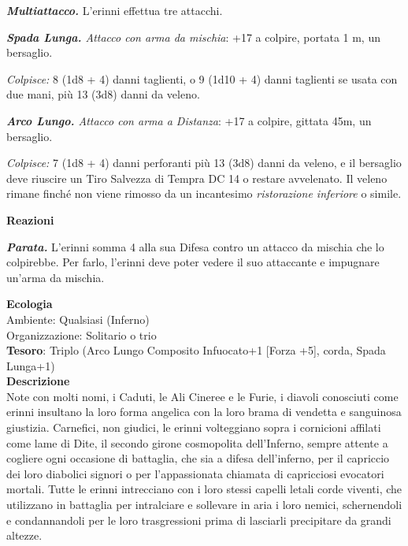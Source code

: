 \begin{multicols}{2}
	\textit{\textbf{Multiattacco.}} L'erinni effettua tre attacchi.

	\textit{\textbf{Spada Lunga.} Attacco con arma da mischia}: +17 a colpire, portata 1 m, un bersaglio.

	\textit{Colpisce:} 8 (1d8 + 4) danni taglienti, o 9 (1d10 + 4) danni taglienti se usata con due mani, più 13 (3d8) danni da veleno.

	\textit{\textbf{Arco Lungo.} Attacco con arma a Distanza}: +17 a colpire, gittata 45m, un bersaglio.

	\textit{Colpisce:} 7 (1d8 + 4) danni perforanti più 13 (3d8) danni da veleno, e il bersaglio deve riuscire un Tiro Salvezza di Tempra DC 14 o restare avvelenato. Il veleno rimane finché non viene rimosso da un incantesimo \textit{ristorazione inferiore} o simile.

	\textbf{Reazioni}

	\textit{\textbf{Parata.}} L'erinni somma 4 alla sua Difesa contro un attacco da mischia che lo colpirebbe. Per farlo, l'erinni deve poter vedere il suo attaccante e impugnare un'arma da mischia.

	\textbf{Ecologia}\\
	Ambiente: Qualsiasi (Inferno)\\
	Organizzazione: Solitario o trio\\
	\textbf{Tesoro}: Triplo (Arco Lungo Composito Infuocato+1 [Forza +5], corda, Spada Lunga+1)\\
	\textbf{Descrizione}\\
	Note con molti nomi, i Caduti, le Ali Cineree e le Furie, i diavoli conosciuti come erinni insultano la loro forma angelica con la loro brama di vendetta e sanguinosa giustizia. Carnefici, non giudici, le erinni volteggiano sopra i cornicioni affilati come lame di Dite, il secondo girone cosmopolita dell'Inferno, sempre attente a cogliere ogni occasione di battaglia, che sia a difesa dell'inferno, per il capriccio dei loro diabolici signori o per l'appassionata chiamata di capricciosi evocatori mortali. Tutte le erinni intrecciano con i loro stessi capelli letali corde viventi, che utilizzano in battaglia per intralciare e sollevare in aria i loro nemici, schernendoli e condannandoli per le loro trasgressioni prima di lasciarli precipitare da grandi altezze.


\end{multicols}
